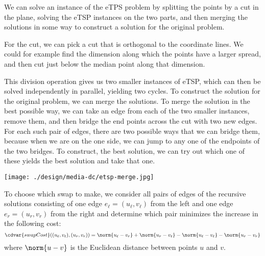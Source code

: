 \begin{gram}
%
%

We can solve an instance of the eTPS problem by splitting the points
by a cut in the plane, solving the eTSP instances on the two parts,
and then merging the solutions in some way to construct a solution for
the original problem.  

For the cut, we can pick a cut that is orthogonal to the coordinate
lines. We could for example find the dimension along which the points
have a larger spread, and then cut just below the median point along
that dimension.  


This division operation gives us two smaller instances of eTSP, which
can then be solved independently in parallel, yielding two cycles.
%
To construct the solution for the original problem, we can merge the
solutions.
%
To merge the solution in the best possible way, we can take an edge
from each of the two smaller instances, remove them, and then bridge
the end points across the cut with two new edges.
%
For each such pair of edges, there are two possible ways that we can bridge
them, because when we are on the one side, we can jump to any one of
the endpoints of the two bridges. 
%
To construct, the best solution, we can try out which one of these
yields the best solution and take that one. 

\begin{center}
  \texttt{[image: ./design/media-dc/etsp-merge.jpg]}
\end{center}
To choose which swap to make, we consider all pairs of edges of
the recursive solutions consisting of one edge $e_\ell = (u_\ell,v_\ell)$ from
the left and one edge $e_r = (u_r,v_r)$ from the right and determine which
pair minimizes the increase in the following
cost: 
\[
\cdvar{swapCost}((u_\ell,v_\ell), (u_r,v_r)) =
\norm{u_\ell-v_r} + \norm{u_r-v_\ell} - \norm{u_\ell-v_\ell} -
\norm{u_r-v_r}
\] where $\norm{u-v}$ is the Euclidean distance between
points $u$ and $v$.

\end{gram}



